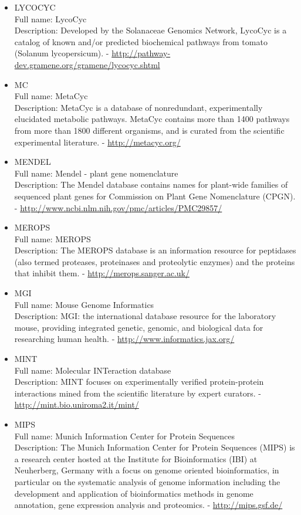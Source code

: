 \begin{itemize}
\item{LYCOCYC}\\ Full name: LycoCyc\\ Description: Developed by the Solanaceae Genomics Network, LycoCyc is a catalog of known and/or predicted biochemical pathways from tomato (Solanum lycopersicum). - 
\url{http://pathway-dev.gramene.org/gramene/lycocyc.shtml}

\item{MC}\\ Full name: MetaCyc\\ Description: MetaCyc is a database of nonredundant, experimentally elucidated metabolic pathways. MetaCyc contains more than 1400 pathways from more than 1800 different organisms, and is curated from the scientific experimental literature. - 
\url{http://metacyc.org/}

\item{MENDEL}\\ Full name: Mendel - plant gene nomenclature\\ Description: The Mendel database contains names for plant-wide families of sequenced plant genes for Commission on Plant Gene Nomenclature (CPGN). - 
\url{http://www.ncbi.nlm.nih.gov/pmc/articles/PMC29857/}

\item{MEROPS}\\ Full name: MEROPS\\ Description: The MEROPS database is an information resource for peptidases (also termed proteases, proteinases and proteolytic enzymes) and the proteins that inhibit them. - 
\url{http://merops.sanger.ac.uk/}

\item{MGI}\\ Full name: Mouse Genome Informatics\\ Description: MGI: the international database resource for the laboratory mouse, providing integrated genetic, genomic, and biological data for researching human health. - 
\url{http://www.informatics.jax.org/}

\item{MINT}\\ Full name: Molecular INTeraction database\\ Description: MINT focuses on experimentally verified protein-protein interactions mined from the scientific literature by expert curators. - 
\url{http://mint.bio.uniroma2.it/mint/}

\item{MIPS}\\ Full name: Munich Information Center for Protein Sequences\\ Description: The Munich Information Center for Protein Sequences (MIPS) is a research center hosted at the Institute for Bioinformatics (IBI) at Neuherberg, Germany with a focus on genome oriented bioinformatics, in particular on the systematic analysis of genome information including the development and application of bioinformatics methods in genome annotation, gene expression analysis and proteomics. - 
\url{http://mips.gsf.de/}


\end{itemize}
